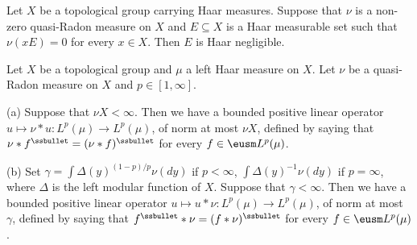  Let $X$ be a topological group carrying Haar
measures.   Suppose that $\nu$ is a non-zero quasi-Radon measure on $X$
and $E\subseteq X$ is a Haar measurable set such that $\nu(xE)=0$ for every
$x\in X$.   Then $E$ is Haar negligible.


 Let $X$ be a topological group and $\mu$ a
left Haar measure on $X$.   Let $\nu$ be a quasi-Radon
measure on $X$ and $p\in[1,\infty]$.

(a) Suppose that $\nu X<\infty$.   Then
we have a bounded positive linear operator
$u\mapsto\nu*u:L^p(\mu)\to L^p(\mu)$, of norm at most $\nu X$, defined
by saying that $\nu*f^{\ssbullet}=(\nu*f)^{\ssbullet}$ for every
$f\in\eusm L^p(\mu)$.

(b) Set $\gamma=\int\Delta(y)^{(1-p)/p}\nu(dy)$ if $p<\infty$,
$\int\Delta(y)^{-1}\nu(dy)$ if $p=\infty$, where $\Delta$ is the left
modular function of $X$.   Suppose that $\gamma<\infty$.   Then we have
a bounded positive linear operator
$u\mapsto u*\nu:L^p(\mu)\to L^p(\mu)$, of norm at most $\gamma$, defined
by saying that $f^{\ssbullet}*\nu=(f*\nu)^{\ssbullet}$ for every
$f\in\eusm L^p(\mu)$.

